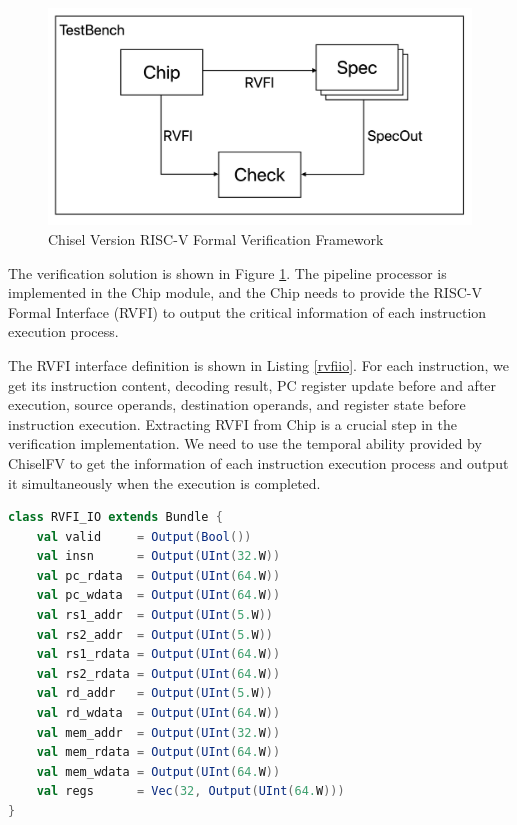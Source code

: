 \documentclass[conference]{IEEEtran}
\theoremstyle{definition}
\begin{document}
\begin{figure}[!htbp]
    \begin{center}
    \includegraphics[width=1\linewidth]{pics/riscvFvChisel.png}
    \caption{Chisel Version RISC-V Formal Verification Framework}
    \label{fig: riscvFv}
    \end{center}
\end{figure}

The verification solution is shown in Figure \ref{fig: riscvFv}. The pipeline processor is implemented in the Chip module, and the Chip needs to provide the RISC-V Formal Interface (RVFI) to output the critical information of each instruction execution process. 

The RVFI interface definition is shown in Listing \ref{rvfiio}.
For each instruction, we get its instruction content, decoding result, PC register update before and after execution, source operands, destination operands, and register state before instruction execution.
Extracting RVFI from Chip is a crucial step in the verification implementation. We need to use the temporal ability provided by ChiselFV to get the information of each instruction execution process and output it simultaneously when the execution is completed.

\begin{lstlisting}[language=scala, caption={RVFI Definition}, label=rvfiio]
class RVFI_IO extends Bundle {
    val valid     = Output(Bool())
    val insn      = Output(UInt(32.W))
    val pc_rdata  = Output(UInt(64.W))
    val pc_wdata  = Output(UInt(64.W))
    val rs1_addr  = Output(UInt(5.W))
    val rs2_addr  = Output(UInt(5.W))
    val rs1_rdata = Output(UInt(64.W))
    val rs2_rdata = Output(UInt(64.W))
    val rd_addr   = Output(UInt(5.W))
    val rd_wdata  = Output(UInt(64.W))
    val mem_addr  = Output(UInt(32.W))
    val mem_rdata = Output(UInt(64.W))
    val mem_wdata = Output(UInt(64.W))
    val regs      = Vec(32, Output(UInt(64.W)))
}
\end{lstlisting}
\end{document}

